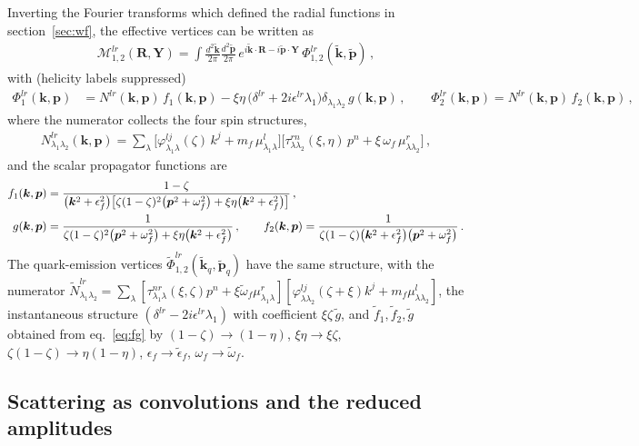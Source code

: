 \documentclass[11pt,a4paper]{article}
\newcommand{\calM}{\mathcal{M}}
\newcommand{\vR}{\bm{R}}
\newcommand{\vY}{\bm{Y}}
\newcommand{\vk}{\bm{k}}
\newcommand{\vp}{\bm{p}}
\newcommand{\kt}{\widetilde{\bm{k}}}
\newcommand{\pt}{\widetilde{\bm{p}}}
\newcommand{\ktq}{\widetilde{\bm{k}}_{q}}
\newcommand{\ptq}{\widetilde{\bm{p}}_{q}}
\newcommand{\eps}{\epsilon}
\numberwithin{equation}{section}
\begin{document}
Inverting the Fourier transforms which defined the radial functions in
section~\ref{sec:wf}, the effective vertices can be written as
\begin{align}
\calM^{lr}_{1,2}(\vR,\vY) = \int\frac{d^{2}\kt}{2\pi}\frac{d^{2}\pt}{2\pi}\,
e^{i\kt\cdot \vR-i\pt\cdot \vY}\,\Phi^{lr}_{1,2}(\kt,\pt)\,,
\end{align}
with (helicity labels suppressed)
\begin{align}
\label{eq:Phidef}
\Phi^{lr}_{1}(\vk,\vp) & = N^{lr}(\vk,\vp)\,f_{1}(\vk,\vp)
-\xi\eta\,\big(\delta^{lr}+2i\epsilon^{lr}\lambda_{1}\big)\delta_{\lambda_{1}\lambda_{2}}\,
g(\vk,\vp)\,,\qquad
\Phi^{lr}_{2}(\vk,\vp) = N^{lr}(\vk,\vp)\,f_{2}(\vk,\vp)\,,
\end{align}
where the numerator collects the four spin structures,
\begin{align}
\label{eq:Ndef}
N^{lr}_{\lambda_{1}\lambda_{2}}(\vk,\vp) = \sum_{\lambda}
\Big[\varphi^{lj}_{\lambda_{1}\lambda}(\zeta)\,k^{j}+m_{f}\,\mu^{l}_{\lambda_{1}\lambda}\Big]
\Big[\tau^{rn}_{\lambda\lambda_{2}}(\xi,\eta)\,p^{n}+\xi\,\omega_{f}\,
\mu^{r}_{\lambda\lambda_{2}}\Big]\,,
\end{align}
and the scalar propagator functions are
\begin{align}
\label{eq:fg}
f_{1}(\vk,\vp) & = \frac{1-\zeta}{\big(\vk^{2}+\eps^{2}_{f}\big)
\big[\zeta(1-\zeta)^{2}\big(\vp^{2}+\omega^{2}_{f}\big)
+\xi\eta\big(\vk^{2}+\eps^{2}_{f}\big)\big]}\,,\notag\\
g(\vk,\vp) & = \frac{1}{\zeta(1-\zeta)^{2}\big(\vp^{2}+\omega^{2}_{f}\big)
+\xi\eta\big(\vk^{2}+\eps^{2}_{f}\big)}\,,\qquad
f_{2}(\vk,\vp) = \frac{1}{\zeta(1-\zeta)\big(\vk^{2}+\eps^{2}_{f}\big)
\big(\vp^{2}+\omega^{2}_{f}\big)}\,.
\end{align}
The quark-emission vertices $\widetilde\Phi^{lr}_{1,2}(\ktq,\ptq)$ have the same structure,
with the numerator
$\widetilde N^{lr}_{\lambda_1\lambda_2}=\sum_\lambda[\tau^{nr}_{\lambda_{1}\lambda}(\xi,\zeta)
p^{n}+\xi\widetilde\omega_{f}\mu^{r}_{\lambda_{1}\lambda}]
[\varphi^{lj}_{\lambda\lambda_{2}}(\zeta+\xi)k^{j}+m_{f}\mu^{l}_{\lambda\lambda_{2}}]$, the
instantaneous structure $(\delta^{lr}-2i\epsilon^{lr}\lambda_{1})$ with coefficient
$\xi\zeta\,\widetilde g$, and $\widetilde f_{1},\widetilde f_{2},\widetilde g$ obtained from
eq.~\eqref{eq:fg} by $(1-\zeta)\to(1-\eta)$, $\xi\eta\to\xi\zeta$,
$\zeta(1-\zeta)\to\eta(1-\eta)$, $\eps_f\to\widetilde\eps_f$, $\omega_f\to\widetilde\omega_f$.

\subsection{Scattering as convolutions and the reduced amplitudes}
\end{document}
